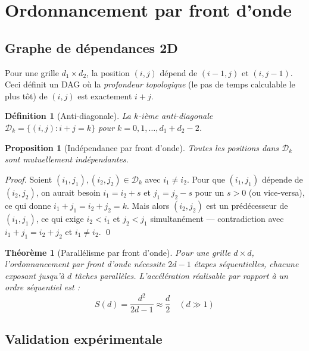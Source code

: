 \documentclass[10pt,onecolumn]{article}
\newtheorem{theorem}{Théorème}
\newtheorem{proposition}{Proposition}
\newtheorem{definition}{Définition}
\begin{document}
\section{Ordonnancement par front d'onde}
\label{sec:wavefront}

\subsection{Graphe de dépendances 2D}

Pour une grille $d_1 \times d_2$, la position $(i,j)$ dépend de $(i{-}1,j)$
et $(i,j{-}1)$. Ceci définit un DAG où la \emph{profondeur topologique}
(le pas de temps calculable le plus tôt) de $(i,j)$ est exactement $i + j$.

\begin{definition}[Anti-diagonale]
  La $k$-ième anti-diagonale $\mathcal{D}_k = \{(i,j) : i+j = k\}$
  pour $k = 0, 1, \ldots, d_1 + d_2 - 2$.
\end{definition}

\begin{proposition}[Indépendance par front d'onde]
  Toutes les positions dans $\mathcal{D}_k$ sont mutuellement indépendantes.
\end{proposition}

\begin{proof}
  Soient $(i_1, j_1), (i_2, j_2) \in \mathcal{D}_k$ avec $i_1 \neq i_2$.
  Pour que $(i_1, j_1)$ dépende de $(i_2, j_2)$, on aurait besoin
  $i_1 = i_2 + s$ et $j_1 = j_2 - s$ pour un $s > 0$ (ou vice‑versa),
  ce qui donne $i_1 + j_1 = i_2 + j_2 = k$. Mais alors $(i_2, j_2)$ est un
  prédécesseur de $(i_1, j_1)$, ce qui exige $i_2 < i_1$ et $j_2 < j_1$
  simultanément — contradiction avec $i_1 + j_1 = i_2 + j_2$ et $i_1 \neq i_2$. \qed
\end{proof}

\begin{theorem}[Parallélisme par front d'onde]
\label{thm:wavefront}
  Pour une grille $d \times d$, l'ordonnancement par front d'onde nécessite
  $2d - 1$ étapes séquentielles, chacune exposant jusqu'à $d$ tâches parallèles.
  L'accélération réalisable par rapport à un ordre séquentiel est :
  \begin{equation}
    S(d) = \frac{d^2}{2d - 1} \approx \frac{d}{2} \quad (d \gg 1)
  \end{equation}
\end{theorem}

\subsection{Validation expérimentale}
\end{document}
